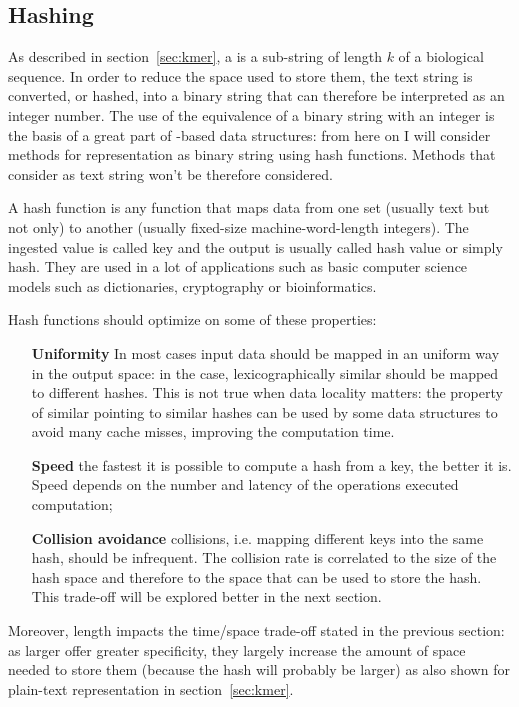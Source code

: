 \subsection{Hashing \kmers}
As described in section~\ref{sec:kmer}, a \kmer is a sub-string of length $k$ of a biological sequence. In order to reduce the space used to store them, the text string is converted, or hashed, into a binary string that can therefore be interpreted as an integer number. The use of the equivalence of a binary string with an integer is the basis of a great part of \kmer-based data structures: from here on I will consider methods for \kmers representation as binary string using hash functions. Methods that consider \kmer as text string won't be therefore considered.
\begin{description}
	\item A hash function is any function that maps data from one set (usually text but not only) to another (usually fixed-size machine-word-length integers). The ingested value is called key and the output is usually called hash value or simply hash. They are used in a lot of applications such as basic computer science models such as dictionaries, cryptography or bioinformatics.
	\item Hash functions should optimize on some of these properties:
	\begin{itemize}
		\item[\textbf{Uniformity}] In most cases input data should be mapped in an uniform way in the output space: in the \kmer case, lexicographically similar \kmers should be mapped to different hashes. This is not true when data locality matters: the property of similar \kmers pointing to similar hashes can be used by some data structures to avoid many cache misses, improving the computation time.
		\item[\textbf{Speed}] the fastest it is possible to compute a hash from a key, the better it is. Speed depends on the number and latency of the operations executed computation;
		\item[\textbf{Collision avoidance}] collisions, i.e. mapping different keys into the same hash, should be infrequent. The collision rate is correlated to the size of the hash space and therefore to the space that can be used to store the hash. This trade-off will be explored better in the next section.
	\end{itemize}
\end{description}
Moreover, \kmer length impacts the time/space trade-off stated in the previous section: as larger \kmer offer greater specificity, they largely increase the amount of space needed to store them (because the hash will probably be larger) as also shown for plain-text representation in section~\ref{sec:kmer}.

